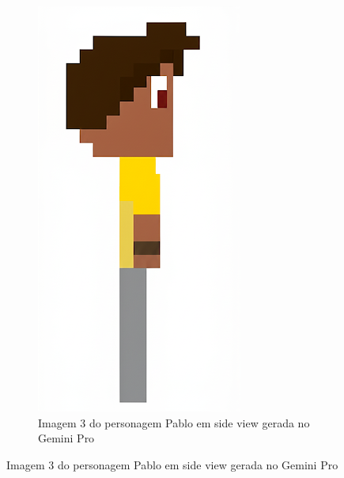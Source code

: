 \begin{figure}[htbp]
    \begin{subfigure}{0.32\linewidth}
        \centering
        \includegraphics[width=1\linewidth]{figs/geminiPro/melhores/chat5.PNG}
        \caption{\small Imagem 3 do personagem Pablo em side view gerada no Gemini Pro}
        \label{fig:chatGPTPabloGeminiPro3}
    \end{subfigure}
\end{figure}

